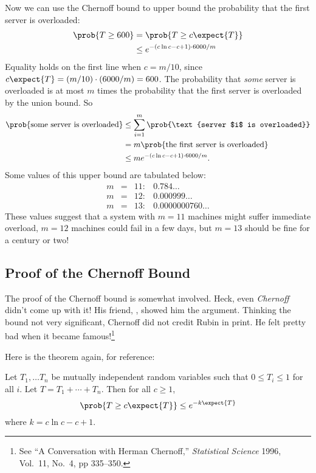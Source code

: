 Now we can use the Chernoff bound to upper bound the probability that
the first server is overloaded:
\begin{align*}
\prob{T \geq 600} & = \prob{T \geq c \expect{T}} \\
  & \leq e^{-(c \ln c - c + 1) \cdot 6000 / m}
\end{align*}
Equality holds on the first line when $c = m / 10$, since $c \expect{T} =
(m / 10) \cdot (6000 / m) = 600$.  The probability that \emph{some}
server is overloaded is at most $m$ times the probability that the
first server is overloaded by the union bound.  So
\begin{align*}
\prob{\text{some server is overloaded}}
    &\le \sum_{i = 1}^m \prob{\text{server $i$ is overloaded}} \\
    &= m \prob{\text{the first server is overloaded}} \\
    &\leq m e^{-(c \ln c - c + 1) \cdot 6000 / m}.
\end{align*}
Some values of this upper bound are tabulated below:
\[
\begin{array}{rcll}
m & = & 11: & 0.784\dots \\
m & = & 12: & 0.000999\dots \\
m & = & 13: & 0.0000000760\dots
\end{array}
\]
These values suggest that a system with $m = 11$ machines might suffer
immediate overload, $m = 12$ machines could fail in a few days, but $m
= 13$ should be fine for a century or two!

\subsection{Proof of the Chernoff Bound}\label{sec:chernoff_proof}

The proof of the Chernoff bound is somewhat involved.  Heck, even
\emph{Chernoff} didn't come up with it!  His friend, , showed him the argument.  Thinking the bound not very
significant, Chernoff did not credit Rubin in print.  He felt pretty
bad when it became famous!\footnote{See ``A Conversation with Herman
  Chernoff,'' \emph{Statistical Science} 1996, Vol.~11, No.~4, pp
  335--350.}

Here is the theorem again, for reference:

\begin{theorem}
Let $T_1, \dots T_n$ be mutually independent random variables such
that $0 \leq T_i \leq 1$ for all $i$.  Let $T = T_1 + \cdots + T_n$.
Then for all $c \geq 1$,
\begin{equation}\label{chernoff-leq}
\prob{T \geq c \expect{T}} \leq e^{-k \expect{T}}
\end{equation}
where $k = c \ln c - c + 1$.
\end{theorem}

